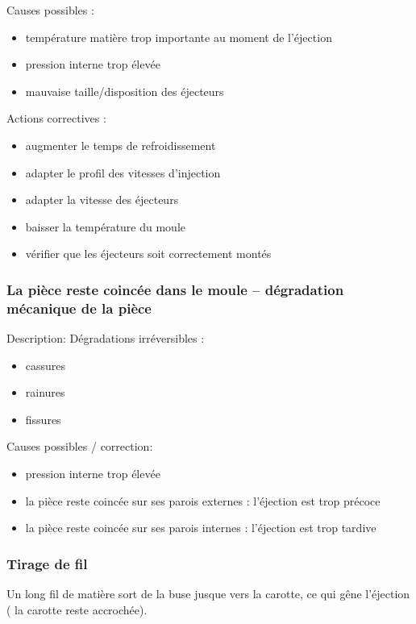 \documentclass[11pt,oneside]{article}
\begin{document}
       Causes possibles : 
\begin{itemize}
 \item température matière trop importante au moment de l’éjection 
 \item pression interne trop élevée 
 \item mauvaise taille/disposition des éjecteurs 
\end{itemize}
       Actions correctives : 
\begin{itemize}
 \item augmenter le temps de refroidissement 
 \item adapter le profil des vitesses d’injection 
 \item adapter la vitesse des éjecteurs 
 \item baisser la température du moule 
 \item vérifier que les éjecteurs soit correctement montés 
\end{itemize}
       \subsubsection{La pièce reste coincée dans le moule – dégradation
mécanique de la pièce}

       Description: 
       Dégradations irréversibles : 
\begin{itemize}
 \item cassures 
 \item rainures 
 \item fissures 
\end{itemize}
       Causes possibles / correction: 
\begin{itemize}
 \item pression interne trop élevée 
 \item la pièce reste coincée sur ses parois externes : l’éjection est trop
précoce 
 \item la pièce reste coincée sur ses parois internes : l’éjection est trop
tardive
\end{itemize}

 
\subsubsection{Tirage de fil}
        
        Un long fil de matière sort de la buse jusque vers la carotte, ce qui
gêne l’éjection ( la 
carotte reste accrochée). 
         
\end{document}
